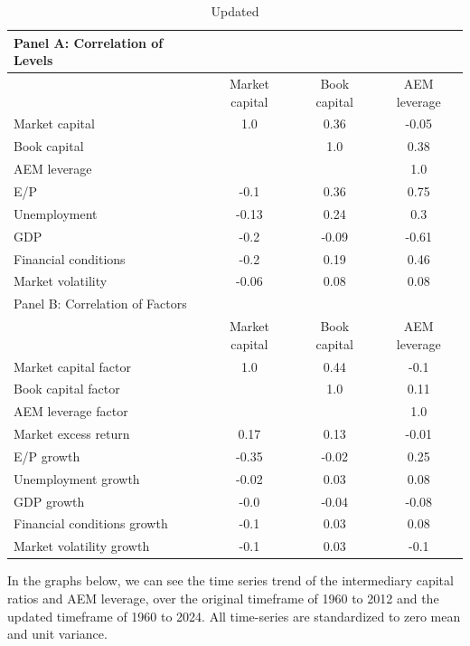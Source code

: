 \documentclass{article}
\begin{document}
    \begin{table}[htbp]
    \centering
    \caption{\label{tab:correlation}Updated}
    \begin{adjustbox}{max width=\textwidth}
    \small
    \begin{tabular}{lccc}
        \toprule
        Panel A: Correlation of Levels \\
        \midrule
         & Market capital & Book capital & AEM leverage \\
        \midrule
        Market capital & 1.0 & 0.36 & -0.05 \\
Book capital &  & 1.0 & 0.38 \\
AEM leverage &  &  & 1.0 \\
E/P & -0.1 & 0.36 & 0.75 \\
Unemployment & -0.13 & 0.24 & 0.3 \\
GDP & -0.2 & -0.09 & -0.61 \\
Financial conditions & -0.2 & 0.19 & 0.46 \\
Market volatility & -0.06 & 0.08 & 0.08 \\
        \midrule
        Panel B: Correlation of Factors \\
        \midrule
         & Market capital & Book capital & AEM leverage \\
        \midrule
        Market capital factor & 1.0 & 0.44 & -0.1 \\
Book capital factor &  & 1.0 & 0.11 \\
AEM leverage factor &  &  & 1.0 \\
Market excess return & 0.17 & 0.13 & -0.01 \\
E/P growth & -0.35 & -0.02 & 0.25 \\
Unemployment growth & -0.02 & 0.03 & 0.08 \\
GDP growth & -0.0 & -0.04 & -0.08 \\
Financial conditions growth & -0.1 & 0.03 & 0.08 \\
Market volatility growth & -0.1 & 0.03 & -0.1 \\
        \bottomrule
    \end{tabular}
    \end{adjustbox}
    \end{table}
    
\clearpage

In the graphs below, we can see the time series trend of the intermediary capital ratios and AEM leverage, over the original timeframe of 1960 to 2012 and the updated timeframe of 1960 to 2024. All time-series are standardized to zero mean and unit variance.
\end{document}
